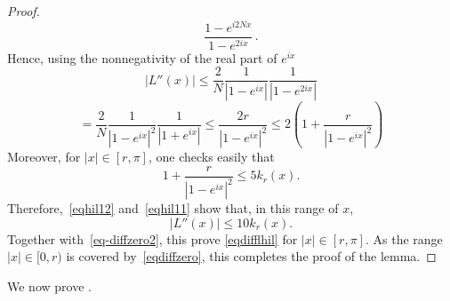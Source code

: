 \documentclass[10pt,a4paper]{article}
\theoremstyle{plain}
\theoremstyle{definition}
\numberwithin{equation}{subsection}
\begin{document}
\begin{proof}
\begin{equation}
     \frac{1-e^{i2Nx}}{1-e^{2ix}}\, .
\end{equation}
Hence, using the nonnegativity of the real part of $e^{ix}$
\begin{equation*}
    |L''(x)|
 \le \frac 2 N \frac {1}{|1-e^{ix}|}
     \frac{1}{|1-e^{2ix}|}
 \end{equation*}
\begin{equation}\label{eqhil11}
    = \frac 2 N \frac {1}{|1-e^{ix}|^2}
     \frac{1}{|1+e^{ix}|}\le
 \frac {2r}{|1-e^{ix}|^2}\le 2 \left(1+\frac {r}{|1-e^{ix}|^2}\right)
\end{equation}
Moreover, for $|x| \in [r, \pi]$, one checks easily that
\begin{equation*}
  1+\frac {r}{|1-e^{ix}|^2} \leq 5 k_r(x).
\end{equation*}
Therefore,~\eqref{eqhil12} and~\eqref{eqhil11} show that, in this range of $x$,
\begin{equation*}
  |L''(x)| \le 10 k_r(x).
\end{equation*}
Together with~\eqref{eq-diffzero2}, this prove \eqref{eqdifflhil} for $|x| \in [r, \pi]$.
As the range $|x| \in [0,r)$ is covered by~\eqref{eqdiffzero}, this completes the proof of the lemma.
\end{proof}


We now prove .
\end{document}

